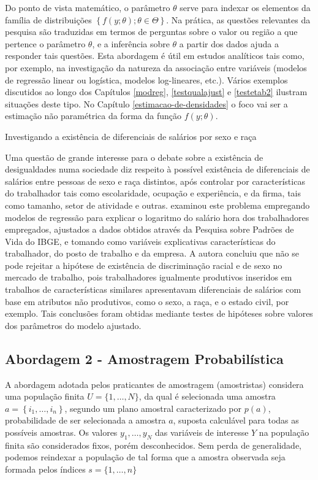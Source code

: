 \documentclass[]{book}
\theoremstyle{definition}
\theoremstyle{definition}
\theoremstyle{definition}
\theoremstyle{remark}
\begin{document}
Do ponto de vista matemático, o parâmetro \(\theta\) serve para indexar
os elementos da família de distribuições
\(\left\{f\left( y;\theta \right);\theta \in \Theta \right\}\). Na
prática, as questões relevantes da pesquisa são traduzidas em termos de
perguntas sobre o valor ou região a que pertence o parâmetro \(\theta\),
e a inferência sobre \(\theta\) a partir dos dados ajuda a responder
tais questões. Esta abordagem é útil em estudos analíticos tais como,
por exemplo, na investigação da natureza da associação entre variáveis
(modelos de regressão linear ou logística, modelos log-lineares, etc.).
Vários exemplos discutidos ao longo dos Capítulos \ref{modreg},
\ref{testqualajust} e \ref{testetab2} ilustram situações deste tipo. No
Capítulo \ref{estimacao-de-densidades} o foco vai ser a estimação não
paramétrica da forma da função \(f(y;\theta)\).

Investigando a existência de diferenciais de salários por sexo e raça

Uma questão de grande interesse para o debate sobre a existência de
desigualdades numa sociedade diz respeito à possível existência de
diferenciais de salários entre pessoas de sexo e raça distintos, após
controlar por características do trabalhador tais como escolaridade,
ocupação e experiência, e da firma, tais como tamanho, setor de
atividade e outras. \citep{Rodrigues} examinou este problema empregando
modelos de regressão para explicar o logaritmo do salário hora dos
trabalhadores empregados, ajustados a dados obtidos através da Pesquisa
sobre Padrões de Vida do IBGE, e tomando como variáveis explicativas
características do trabalhador, do posto de trabalho e da empresa. A
autora concluiu que não se pode rejeitar a hipótese de existência de
discriminação racial e de sexo no mercado de trabalho, pois
trabalhadores igualmente produtivos inseridos em trabalhos de
características similares apresentavam diferenciais de salários com base
em atributos não produtivos, como o sexo, a raça, e o estado civil, por
exemplo. Tais conclusões foram obtidas mediante testes de hipóteses
sobre valores dos parâmetros do modelo ajustado.

\subsection{Abordagem 2 - Amostragem
Probabilística}\label{abordagem-2---amostragem-probabilistica}

A abordagem adotada pelos praticantes de amostragem (amostristas)
considera uma população finita \(U=\{1,\ldots ,N\}\), da qual é
selecionada uma amostra \(a=\left\{ i_{1},\ldots ,i_{n}\right\}\),
segundo um plano amostral caracterizado por \(p\left( a\right)\),
probabilidade de ser selecionada a amostra \(a\), suposta calculável
para todas as possíveis amostras. Os valores \(y_{1},\ldots ,y_{N}\) das
variáveis de interesse \(Y\) na população finita são considerados fixos,
porém desconhecidos. Sem perda de generalidade, podemos reindexar a
população de tal forma que a amostra observada seja formada pelos
índices \(s=\{1,\ldots,n\}\) \textbar{}
\end{document}
